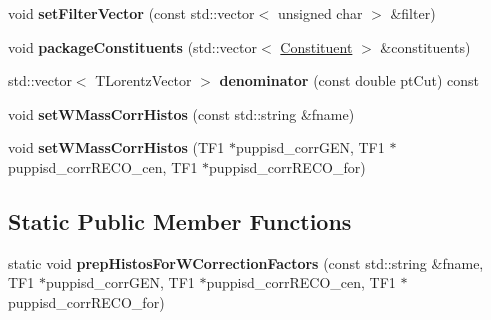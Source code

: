 \begin{DoxyCompactItemize}
\item 
\hypertarget{classttUtility_1_1ConstAK8Inputs_a39f742ec9eeea7a70846e9d58c4adc5f}{void {\bfseries set\-Filter\-Vector} (const std\-::vector$<$ unsigned char $>$ \&filter)}\label{classttUtility_1_1ConstAK8Inputs_a39f742ec9eeea7a70846e9d58c4adc5f}

\item 
\hypertarget{classttUtility_1_1ConstAK8Inputs_ad683f671c23aff9b62390768d3f4465d}{void {\bfseries package\-Constituents} (std\-::vector$<$ \hyperlink{classConstituent}{Constituent} $>$ \&constituents)}\label{classttUtility_1_1ConstAK8Inputs_ad683f671c23aff9b62390768d3f4465d}

\item 
\hypertarget{classttUtility_1_1ConstAK8Inputs_a12d0d3c568150364c47bd5df3040e9d2}{std\-::vector$<$ T\-Lorentz\-Vector $>$ {\bfseries denominator} (const double pt\-Cut) const }\label{classttUtility_1_1ConstAK8Inputs_a12d0d3c568150364c47bd5df3040e9d2}

\item 
\hypertarget{classttUtility_1_1ConstAK8Inputs_a3e3525981c06e0b48378aead76fae238}{void {\bfseries set\-W\-Mass\-Corr\-Histos} (const std\-::string \&fname)}\label{classttUtility_1_1ConstAK8Inputs_a3e3525981c06e0b48378aead76fae238}

\item 
\hypertarget{classttUtility_1_1ConstAK8Inputs_a2810eece820e004b5e34701dacbed554}{void {\bfseries set\-W\-Mass\-Corr\-Histos} (T\-F1 $\ast$puppisd\-\_\-corr\-G\-E\-N, T\-F1 $\ast$puppisd\-\_\-corr\-R\-E\-C\-O\-\_\-cen, T\-F1 $\ast$puppisd\-\_\-corr\-R\-E\-C\-O\-\_\-for)}\label{classttUtility_1_1ConstAK8Inputs_a2810eece820e004b5e34701dacbed554}

\end{DoxyCompactItemize}
\subsection*{Static Public Member Functions}
\begin{DoxyCompactItemize}
\item 
\hypertarget{classttUtility_1_1ConstAK8Inputs_ae1da3abdf5b4d0fafeb2daa57eaa2bbe}{static void {\bfseries prep\-Histos\-For\-W\-Correction\-Factors} (const std\-::string \&fname, T\-F1 $\ast$puppisd\-\_\-corr\-G\-E\-N, T\-F1 $\ast$puppisd\-\_\-corr\-R\-E\-C\-O\-\_\-cen, T\-F1 $\ast$puppisd\-\_\-corr\-R\-E\-C\-O\-\_\-for)}\label{classttUtility_1_1ConstAK8Inputs_ae1da3abdf5b4d0fafeb2daa57eaa2bbe}

\end{DoxyCompactItemize}

